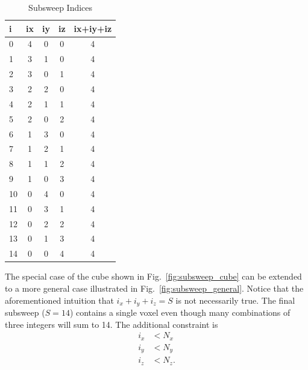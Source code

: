 \begin{table}[ht]
\caption{Subsweep Indices}
\centering 
\begin{tabular}{l | c | c | c | c}
  \hline \hline   
  i  & ix & iy & iz & ix+iy+iz \\ [0.5ex] %
  \hline
  0  & 4 & 0 & 0 & 4\\
  1  & 3 & 1 & 0 & 4\\
  2  & 3 & 0 & 1 & 4\\
  3  & 2 & 2 & 0 & 4\\
  4  & 2 & 1 & 1 & 4\\
  5  & 2 & 0 & 2 & 4\\
  6  & 1 & 3 & 0 & 4\\
  7  & 1 & 2 & 1 & 4\\
  8  & 1 & 1 & 2 & 4\\
  9  & 1 & 0 & 3 & 4\\
  10 & 0 & 4 & 0 & 4\\
  11 & 0 & 3 & 1 & 4\\
  12 & 0 & 2 & 2 & 4\\
  13 & 0 & 1 & 3 & 4\\
  14 & 0 & 0 & 4 & 4\\ [1ex]      %
  \hline
\end{tabular}
\label{table:subsweep}
\end{table}

The special case of the cube shown in Fig.~\ref{fig:subsweep_cube} can be extended to a more general case illustrated in Fig.~\ref{fig:subsweep_general}. Notice that the aforementioned intuition that $i_x + i_y + i_z = S$ is not necessarily true. The final subsweep ($S = 14$) contains a single voxel even though many combinations of three integers will sum to 14. The additional constraint is
\begin{equation}\label{eq:constraints}
\begin{split}
i_x &< N_x \\
i_y &< N_y \\
i_z &< N_z.
\end{split}
\end{equation}


